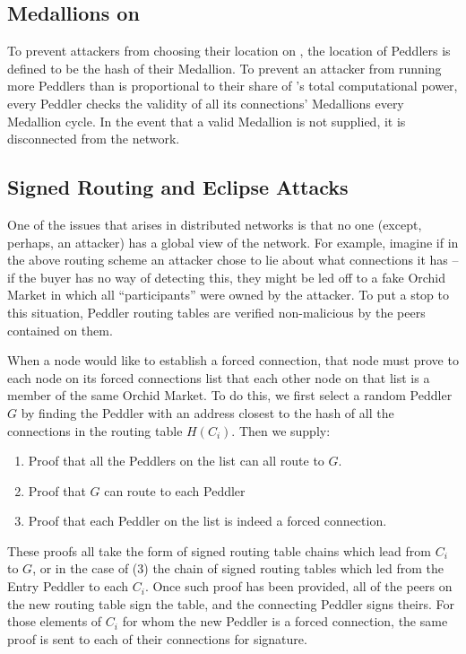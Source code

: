 \subsection{Medallions on \tOM{}}

To prevent attackers from choosing their location on \tOM{}, the
location of Peddlers is defined to be the hash of their Medallion.  To
prevent an attacker from running more Peddlers than is proportional to
their share of \tOM{}'s total computational power, every Peddler
checks the validity of all its connections' Medallions every Medallion
cycle. In the event that a valid Medallion is not supplied, it is
disconnected from the network.

\subsection{Signed Routing and Eclipse Attacks}

One of the issues that arises in distributed networks is that no one (except, perhaps, an attacker) has a global view of the network. For example, imagine if in the above routing scheme an attacker chose to lie about what connections it has – if the buyer has no way of detecting this, they might be led off to a fake Orchid Market in which all “participants” were owned by the attacker. To put a stop to this situation, Peddler routing tables are verified non-malicious by the peers contained on them.

When a node would like to establish a forced connection, that node must prove to each node on its forced connections list that each other node on that list is a member of the same Orchid Market. To do this, we first select a random Peddler $G$ by finding the Peddler with an address closest to the hash of all the connections in the routing table $H(C_i)$. Then we supply:

\begin{enumerate}
\item Proof that all the Peddlers on the list can all route to $G$.
\item Proof that $G$ can route to each Peddler
\item Proof that each Peddler on the list is indeed a forced connection.
\end{enumerate}

These proofs all take the form of signed routing table chains which lead from $C_i$ to $G$, or in the case of (3) the chain of signed routing tables which led from the Entry Peddler to each $C_i$. Once such proof has been provided, all of the peers on the new routing table sign the table, and the connecting Peddler signs theirs. For those elements of $C_i$ for whom the new Peddler is a forced connection, the same proof is sent to each of their connections for signature.

